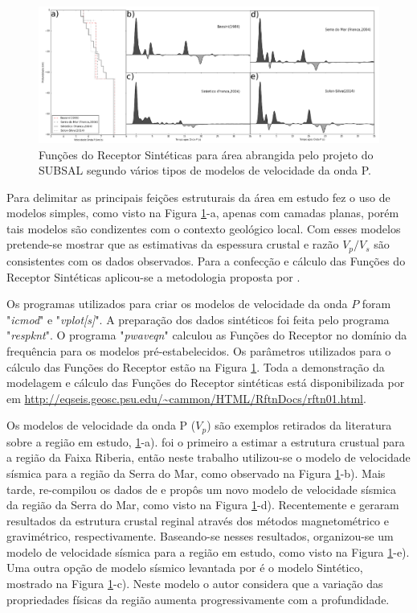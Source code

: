 \begin{figure}[!ht]
\centering
\includegraphics[scale=0.25]{Figs/modelagem_RF.png}
\caption{Funções do Receptor Sintéticas para área abrangida pelo projeto do SUBSAL segundo vários tipos de modelos de velocidade da onda P.}
\label{modelagem}
\end{figure}

Para delimitar as principais feições estruturais da área em estudo fez o uso de modelos simples, como visto na Figura \ref{modelagem}-a, apenas com camadas planas, porém tais modelos são condizentes com o contexto geológico local. Com esses modelos pretende-se mostrar que as estimativas da espessura crustal e razão $V_{p}/V_{s}$ são consistentes com os dados observados. Para a confecção e cálculo das Funções do Receptor Sintéticas aplicou-se a metodologia proposta por \cite{Ammon_waterlevel_1997}. 

Os programas utilizados para criar os modelos de velocidade da onda $P$ foram "\textit{icmod}" e "\textit{vplot[s]}". A preparação dos dados sintéticos foi feita pelo programa "\textit{respknt}". O programa "\textit{pwaveqn}" calculou as Funções do Receptor no domínio da frequência para os modelos pré-estabelecidos. Os parâmetros utilizados para o cálculo das Funções do Receptor estão na Figura \ref{modelagem}. Toda a demonstração da modelagem e cálculo das Funções do Receptor sintéticas está disponibilizada por \cite{Ammon_waterlevel_1997} em \url{http://eqseis.geosc.psu.edu/~cammon/HTML/RftnDocs/rftn01.html}.

Os modelos de velocidade da onda P ($V_{p}$) são exemplos retirados da literatura sobre a região em estudo, \ref{modelagem}-a). \cite{Bassini_1986} foi o primeiro a estimar a estrutura crustual para a região da Faixa Riberia, então neste trabalho utilizou-se o modelo de velocidade sísmica para a região da Serra do Mar, como observado na Figura \ref{modelagem}-b). Mais tarde, \cite{sand_franca_crustal_2004} re-compilou os dados de \cite{Bassini_1986} e propôs um novo modelo de velocidade sísmica da região da Serra do Mar, como visto na Figura \ref{modelagem}-d). Recentemente \cite{flora_solon_ancient_2013} e \cite{Silva_2014} geraram resultados da estrutura crustal reginal através dos métodos magnetométrico e gravimétrico, respectivamente. Baseando-se nesses resultados, organizou-se um modelo de velocidade sísmica para a região em estudo, como visto na Figura \ref{modelagem}-e). Uma outra opção de modelo sísmico levantada por \cite{sand_franca_crustal_2004} é o modelo Sintético, mostrado na Figura \ref{modelagem}-c). Neste modelo o autor considera que a variação das propriedades físicas da região aumenta progressivamente com a profundidade.

